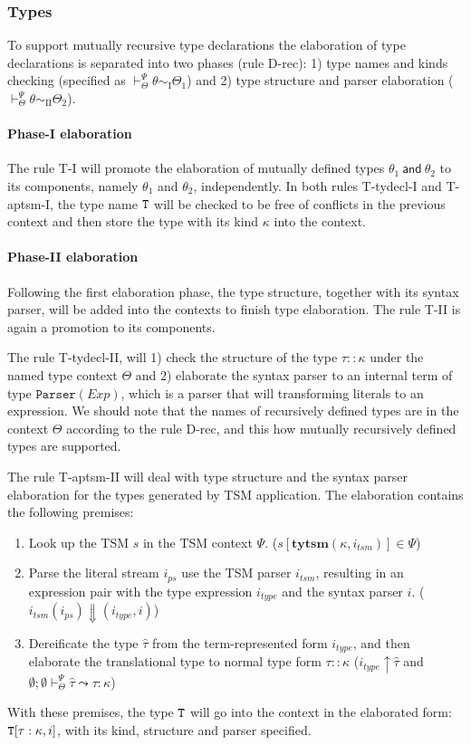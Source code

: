 \subsubsection{Types}
To support mutually recursive type declarations the elaboration of type declarations is separated into two phases (rule D-rec): 1) type names and kinds checking (specified as $\vdash_{\Theta}^{\Psi}\theta\sim_{\mathrm{I}}\Theta_1$) and 2) type structure and parser elaboration ($\vdash_{\Theta}^{\Psi}\theta\sim_{\mathrm{II}}\Theta_2$). 

\paragraph{Phase-I elaboration} The rule T-I will promote the elaboration of mutually defined types $\theta_1~\mathsf{and}~\theta_2$ to its components, namely $\theta_1$ and $\theta_2$, independently.  In both rules T-tydecl-I and T-aptsm-I, the type name $\mathtt{T}$ will be checked to be free of conflicts in the previous context and then store the type with its kind $\kappa$ into the context.

\paragraph{Phase-II elaboration}
Following the first elaboration phase, the type structure, together with its syntax parser, will be added into the contexts to finish type elaboration. The rule T-II is again a promotion to its components. 

The rule T-tydecl-II, will 1) check the structure of the type $\tau::\kappa$ under the named type context $\Theta$ and 2) elaborate the syntax parser to an internal term of type $\mathtt{Parser}(Exp)$, which is a parser that will transforming literals to an expression. We should note that the names of recursively defined types are in the context $\Theta$ according to the rule D-rec, and this how mutually recursively defined types are supported.

The rule T-aptsm-II will deal with type structure and the syntax parser elaboration for the types generated by TSM application. The elaboration contains the following premises:
\begin{enumerate}
\item Look up the TSM $s$ in the TSM context $\Psi$. ($s[\mathbf{tytsm}(\kappa,i_{tsm})]\in\Psi$)
\item Parse the literal stream $i_{ps}$ use the TSM parser $i_{tsm}$, resulting in an expression pair with the type expression $i_{type}$ and the syntax parser $i$. ($i_{tsm}(i_{ps})\Downarrow (i_{type},i)$)
\item Dereificate the type $\hat\tau$ from the term-represented form $i_{type}$, and then elaborate the translational type to normal type form $\tau::\kappa$ ($i_{type}\uparrow\hat\tau$ and $\emptyset;\emptyset\vdash^{\Psi}_{\Theta}\hat\tau\leadsto\tau:\kappa$)
\end{enumerate}
With these premises, the type $\mathtt{T}$ will go into the context in the elaborated form: $\mathtt{T}[\tau:\kappa,i]$, with its kind, structure and parser specified.

